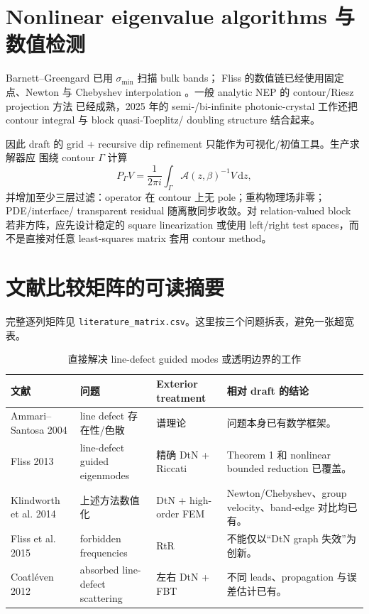 \documentclass[UTF8,11pt,fontset=none]{ctexart}
\begin{document}
\section{Nonlinear eigenvalue algorithms 与数值检测}

Barnett--Greengard 已用 \(\sigma_{\min}\) 扫描 bulk bands\cite{BarnettGreengard2010}；
Fliss 的数值链已经使用固定点、Newton 与 Chebyshev interpolation
\cite{KlindworthSchmidtFliss2014}。一般 analytic NEP 的 contour/Riesz projection 方法
已经成熟\cite{BinkowskiZschiedrichBurger2020,BrennanEmbreeGugercin2023}，2025 年的
semi-/bi-infinite photonic-crystal 工作还把 contour integral 与 block quasi-Toeplitz/
doubling structure 结合起来\cite{LyuLiLin2025}。

因此 draft 的 grid + recursive dip refinement 只能作为可视化/初值工具。生产求解器应
围绕 contour \(\Gamma\) 计算
\begin{equation}
  P_\Gamma V = \frac{1}{2\pi i}\int_\Gamma
  \mathcal A(z,\beta)^{-1}V\,\mathrm dz,
\end{equation}
并增加至少三层过滤：operator 在 contour 上无 pole；重构物理场非零；PDE/interface/
transparent residual 随离散同步收敛。对 relation-valued block 若非方阵，应先设计稳定的
square linearization 或使用 left/right test spaces，而不是直接对任意 least-squares matrix
套用 contour method。

\section{文献比较矩阵的可读摘要}

完整逐列矩阵见 \texttt{literature\_matrix.csv}。这里按三个问题拆表，避免一张超宽表。

\begin{table}[htbp]
\centering
\caption{直接解决 line-defect guided modes 或透明边界的工作}
\small
\begin{tabularx}{\textwidth}{p{} p{} p{} Y}
\toprule
文献 & 问题 & Exterior treatment & 相对 draft 的结论 \\
\midrule
Ammari--Santosa 2004 & line defect 存在性/色散 & 谱理论 & 问题本身已有数学框架。 \\
Fliss 2013 & line-defect guided eigenmodes & 精确 DtN + Riccati & Theorem 1 和 nonlinear bounded reduction 已覆盖。 \\
Klindworth et al. 2014 & 上述方法数值化 & DtN + high-order FEM & Newton/Chebyshev、group velocity、band-edge 对比均已有。 \\
Fliss et al. 2015 & forbidden frequencies & RtR & 不能仅以“DtN graph 失效”为创新。 \\
Coatléven 2012 & absorbed line-defect scattering & 左右 DtN + FBT & 不同 leads、propagation 与误差估计已有。 \\
\bottomrule
\end{tabularx}
\end{table}
\end{document}
